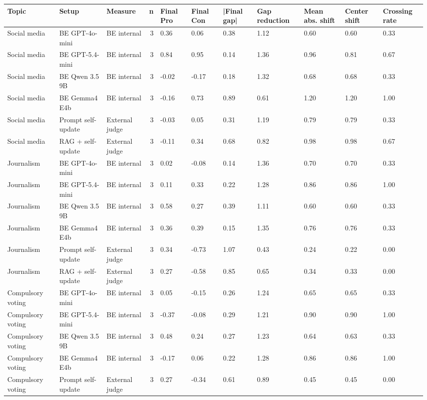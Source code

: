 \begin{tabular}{lllrlllllll}
\toprule
Topic & Setup & Measure & n & Final Pro & Final Con & |Final gap| & Gap reduction & Mean abs. shift & Center shift & Crossing rate \\
\midrule
Social media & BE GPT-4o-mini & BE internal & 3 & 0.36 & 0.06 & 0.38 & 1.12 & 0.60 & 0.60 & 0.33 \\
Social media & BE GPT-5.4-mini & BE internal & 3 & 0.84 & 0.95 & 0.14 & 1.36 & 0.96 & 0.81 & 0.67 \\
Social media & BE Qwen 3.5 9B & BE internal & 3 & -0.02 & -0.17 & 0.18 & 1.32 & 0.68 & 0.68 & 0.33 \\
Social media & BE Gemma4 E4b & BE internal & 3 & -0.16 & 0.73 & 0.89 & 0.61 & 1.20 & 1.20 & 1.00 \\
Social media & Prompt self-update & External judge & 3 & -0.03 & 0.05 & 0.31 & 1.19 & 0.79 & 0.79 & 0.33 \\
Social media & RAG + self-update & External judge & 3 & -0.11 & 0.34 & 0.68 & 0.82 & 0.98 & 0.98 & 0.67 \\
Journalism & BE GPT-4o-mini & BE internal & 3 & 0.02 & -0.08 & 0.14 & 1.36 & 0.70 & 0.70 & 0.33 \\
Journalism & BE GPT-5.4-mini & BE internal & 3 & 0.11 & 0.33 & 0.22 & 1.28 & 0.86 & 0.86 & 1.00 \\
Journalism & BE Qwen 3.5 9B & BE internal & 3 & 0.58 & 0.27 & 0.39 & 1.11 & 0.60 & 0.60 & 0.33 \\
Journalism & BE Gemma4 E4b & BE internal & 3 & 0.36 & 0.39 & 0.15 & 1.35 & 0.76 & 0.76 & 0.33 \\
Journalism & Prompt self-update & External judge & 3 & 0.34 & -0.73 & 1.07 & 0.43 & 0.24 & 0.22 & 0.00 \\
Journalism & RAG + self-update & External judge & 3 & 0.27 & -0.58 & 0.85 & 0.65 & 0.34 & 0.33 & 0.00 \\
Compulsory voting & BE GPT-4o-mini & BE internal & 3 & 0.05 & -0.15 & 0.26 & 1.24 & 0.65 & 0.65 & 0.33 \\
Compulsory voting & BE GPT-5.4-mini & BE internal & 3 & -0.37 & -0.08 & 0.29 & 1.21 & 0.90 & 0.90 & 1.00 \\
Compulsory voting & BE Qwen 3.5 9B & BE internal & 3 & 0.48 & 0.24 & 0.27 & 1.23 & 0.64 & 0.63 & 0.33 \\
Compulsory voting & BE Gemma4 E4b & BE internal & 3 & -0.17 & 0.06 & 0.22 & 1.28 & 0.86 & 0.86 & 1.00 \\
Compulsory voting & Prompt self-update & External judge & 3 & 0.27 & -0.34 & 0.61 & 0.89 & 0.45 & 0.45 & 0.00 \\

\end{tabular}
